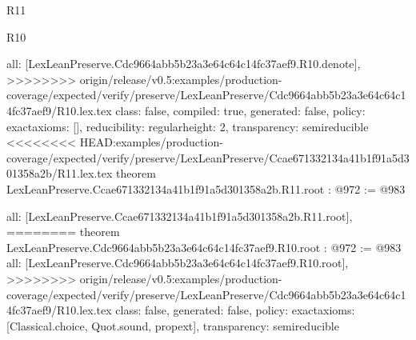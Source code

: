 \begin{lexlean}{R11}
\begin{lexlean}{R10}
\begin{coremodule}
{{{{{  all: [LexLeanPreserve.Cdc9664abb5b23a3e64c64c14fc37aef9.R10.denote],
>>>>>>>> origin/release/v0.5:examples/production-coverage/expected/verify/preserve/LexLeanPreserve/Cdc9664abb5b23a3e64c64c14fc37aef9/R10.lex.tex
  class: false,
  compiled: true,
  generated: false,
  policy: exact{axioms: []},
  reducibility: regular{height: 2},
  transparency: semireducible
}
<<<<<<<< HEAD:examples/production-coverage/expected/verify/preserve/LexLeanPreserve/Ccae671332134a41b1f91a5d301358a2b/R11.lex.tex
theorem LexLeanPreserve.Ccae671332134a41b1f91a5d301358a2b.R11.root : @972 := @983 {
  all: [LexLeanPreserve.Ccae671332134a41b1f91a5d301358a2b.R11.root],
========
theorem LexLeanPreserve.Cdc9664abb5b23a3e64c64c14fc37aef9.R10.root : @972 := @983 {
  all: [LexLeanPreserve.Cdc9664abb5b23a3e64c64c14fc37aef9.R10.root],
>>>>>>>> origin/release/v0.5:examples/production-coverage/expected/verify/preserve/LexLeanPreserve/Cdc9664abb5b23a3e64c64c14fc37aef9/R10.lex.tex
  class: false,
  generated: false,
  policy: exact{axioms: [Classical.choice, Quot.sound, propext]},
  transparency: semireducible
}

}}}}}
\end{coremodule}
\end{lexlean}
\end{lexlean}
